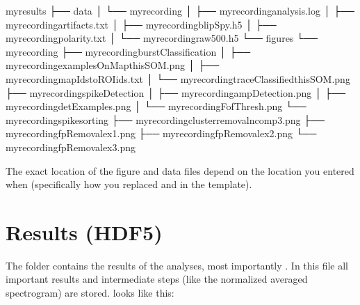 \documentclass[letterpaper,10pt,english]{sphinxmanual}
\begin{document}
%
\begin{sphinxVerbatim}[commandchars=\\\{\}]
my\PYGZus{}results
├── data
│ └── my\PYGZus{}recording
│     ├── my\PYGZus{}recording\PYGZus{}\PYGZus{}analysis.log
│     ├── my\PYGZus{}recording\PYGZus{}\PYGZus{}artifacts.txt
│     ├── my\PYGZus{}recording\PYGZus{}\PYGZus{}blipSpy.h5
│     ├── my\PYGZus{}recording\PYGZus{}\PYGZus{}polarity.txt
│     └── my\PYGZus{}recording\PYGZus{}\PYGZus{}raw500.h5
└── figures
    └── my\PYGZus{}recording
        ├── my\PYGZus{}recording\PYGZus{}\PYGZus{}burstClassification
        │   ├── my\PYGZus{}recording\PYGZus{}\PYGZus{}examplesOnMap\PYGZus{}thisSOM.png
        │   ├── my\PYGZus{}recording\PYGZus{}\PYGZus{}mapIds\PYGZus{}to\PYGZus{}ROIids.txt
        │   └── my\PYGZus{}recording\PYGZus{}\PYGZus{}traceClassified\PYGZus{}thisSOM.png
        ├── my\PYGZus{}recording\PYGZus{}\PYGZus{}spikeDetection
        │   ├── my\PYGZus{}recording\PYGZus{}\PYGZus{}ampDetection.png
        │   ├── my\PYGZus{}recording\PYGZus{}\PYGZus{}detExamples.png
        │   └── my\PYGZus{}recording\PYGZus{}\PYGZus{}FofThresh.png
        └── my\PYGZus{}recording\PYGZus{}\PYGZus{}spikesorting
            ├── my\PYGZus{}recording\PYGZus{}\PYGZus{}clusterremoval\PYGZus{}ncomp3.png
            ├── my\PYGZus{}recording\PYGZus{}\PYGZus{}fpRemoval\PYGZus{}ex1.png
            ├── my\PYGZus{}recording\PYGZus{}\PYGZus{}fpRemoval\PYGZus{}ex2.png
            └── my\PYGZus{}recording\PYGZus{}\PYGZus{}fpRemoval\PYGZus{}ex3.png
\end{sphinxVerbatim}

The exact location of the figure and data files depend on the location you entered when {\hyperref[\detokenize{setting_parameters:replacement-params}]{}}
(specifically how you replaced  and  in the template).


\section{Results (HDF5)}
\label{\detokenize{output:results-hdf5}}\label{\detokenize{output:resultshdf5}}
The folder  contains the results of the analyses, most importantly .
In this file all important results and intermediate steps (like the normalized averaged spectrogram) are stored.
 looks like this:
\end{document}
